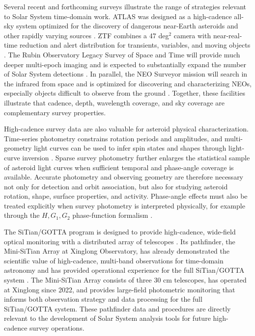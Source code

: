 \documentclass[referee]{raa}
\begin{document}
Several recent and forthcoming surveys illustrate the range of strategies relevant to Solar System time-domain work. ATLAS was designed as a high-cadence all-sky system optimized for the discovery of dangerous near-Earth asteroids and other rapidly varying sources \citep{Tonry2018}. ZTF combines a 47 deg$^2$ camera with near-real-time reduction and alert distribution for transients, variables, and moving objects \citep{Bellm2019,Patterson2019}. The Rubin Observatory Legacy Survey of Space and Time will provide much deeper multi-epoch imaging and is expected to substantially expand the number of Solar System detections \citep{Ivezic2019,Jones2018,Schwamb2023}. In parallel, the NEO Surveyor mission will search in the infrared from space and is optimized for discovering and characterizing NEOs, especially objects difficult to observe from the ground \citep{Mainzer2023}. Together, these facilities illustrate that cadence, depth, wavelength coverage, and sky coverage are complementary survey properties.

High-cadence survey data are also valuable for asteroid physical characterization. Time-series photometry constrains rotation periods and amplitudes, and multi-geometry light curves can be used to infer spin states and shapes through light-curve inversion \citep{Kaasalainen2001a,Kaasalainen2001b,Warner2009}. Sparse survey photometry further enlarges the statistical sample of asteroid light curves when sufficient temporal and phase-angle coverage is available. Accurate photometry and observing geometry are therefore necessary not only for detection and orbit association, but also for studying asteroid rotation, shape, surface properties, and activity. Phase-angle effects must also be treated explicitly when survey photometry is interpreted physically, for example through the $H,G_1,G_2$ phase-function formalism \citep{Muinonen2010}.

The SiTian/GOTTA program is designed to provide high-cadence, wide-field optical monitoring with a distributed array of telescopes \citep{Liu2021}. Its pathfinder, the Mini-SiTian Array at Xinglong Observatory, has already demonstrated the scientific value of high-cadence, multi-band observations for time-domain astronomy and has provided operational experience for the full SiTian/GOTTA system \citep{Huang2025MiniSitian,Han2025MiniSitianWhitePaper}. The Mini-SiTian Array consists of three 30 cm telescopes, has operated at Xinglong since 2022, and provides large-field photometric monitoring that informs both observation strategy and data processing for the full SiTian/GOTTA system. These pathfinder data and procedures are directly relevant to the development of Solar System analysis tools for future high-cadence survey operations.
\end{document}
